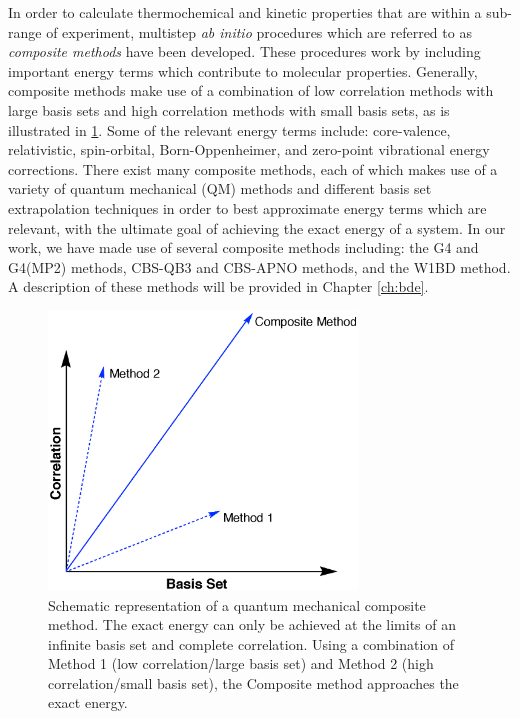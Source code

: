 In order to calculate thermochemical and kinetic properties that are within a sub-\kcalmol range of experiment, multistep \emph{ab initio} procedures which are referred to as \emph{composite methods} have been developed.\cite{Karton2016} These procedures work by including important energy terms which contribute to molecular properties. Generally, composite methods make use of a combination of low correlation methods with large basis sets and high correlation methods with small basis sets, as is illustrated in \ref{fig:comp}. Some of the relevant energy terms include: core-valence, relativistic, spin-orbital, Born-Oppenheimer, and zero-point vibrational energy corrections. There exist many composite methods, each of which makes use of a variety of quantum mechanical (QM) methods and different basis set extrapolation techniques in order to best approximate energy terms which are relevant, with the ultimate goal of achieving the exact energy of a system. In our work, we have made use of several composite methods including: the G4 and G4(MP2) methods,\cite{Curtiss2007,Curtiss2007a} CBS-QB3 and CBS-APNO methods,\cite{Montgomery1999,Montgomery2000,Ochterski1996} and the W1BD method.\cite{Barnes2009} A description of these methods will be provided in Chapter \ref{ch:bde}.

\begin{figure}[htb]
  \centering
  \includegraphics[height=20em]{figures/compositemethods.eps}
  \caption[Schematic representation of a quantum mechanical composite method.]{Schematic representation of a quantum mechanical composite method. The exact energy can only be achieved at the limits of an infinite basis set and complete correlation. Using a combination of Method 1 (low correlation/large basis set) and Method 2 (high correlation/small basis set), the Composite method approaches the exact energy.}
  \label{fig:comp}
\end{figure}

